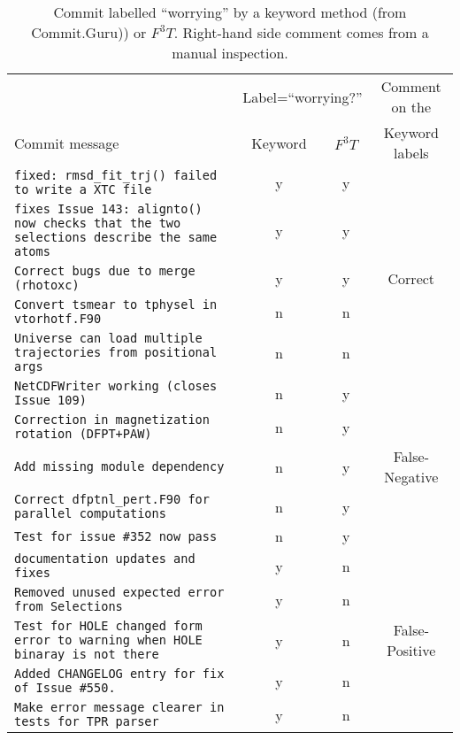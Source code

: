 \begin{table*}
\scriptsize
\begin{center}
\caption{Commit labelled  ``worrying'' by 
a keyword method (from Commit.Guru\cite{commitguru})) or   $F^3T$. 
Right-hand side comment comes from a manual inspection.} 
\vspace{-5pt}
\begin{tabular}{l|cc|c}
                 & \multicolumn{2}{|c|}{Label=``worrying?''} & Comment on the\\
  Commit message & Keyword & $F^3T$ &  Keyword labels\\ 
\hline
\texttt{fixed: rmsd\_fit\_trj() failed to write a XTC file} & y & y &   \\ 
\texttt{fixes Issue 143: alignto() now checks that the two selections describe the same atoms} & y &	y &   \\ 
\texttt{Correct bugs due to merge (rhotoxc)}	& y &	y & Correct\\ 
\texttt{Convert tsmear to tphysel in vtorhotf.F90} &	n &	n &  \\ 
\texttt{Universe can load multiple trajectories from positional args} &	n &	n &   \\ \hline
\texttt{NetCDFWriter working (closes Issue 109)}	& n &	y &  \\ 
\texttt{Correction in magnetization rotation (DFPT+PAW)} &	n &	y &  \\
\texttt{Add missing module dependency} &	n &	y & False-Negative\\ 
\texttt{Correct dfptnl\_pert.F90 for parallel computations} &	n &	y &  \\ 
\texttt{Test for issue \#352 now pass} &	n &	y &  \\ \hline
\texttt{documentation updates and fixes} &	y &	n &   \\ 
\texttt{Removed unused expected error from Selections} &	y &	n &   \\ 
\texttt{Test for HOLE changed form error to warning when HOLE binaray is not there} &	y &	n & False-Positive  \\ 
\texttt{Added CHANGELOG entry for fix of Issue \#550.} &	y &	n &  \\ 
\texttt{Make error message clearer in tests for TPR parser} &	y &	n &   \\ \hline
\end{tabular}
\label{tbl:sample}
\end{center} 
\end{table*}